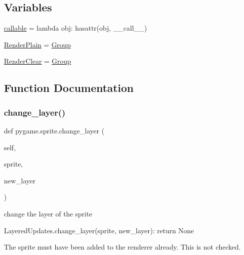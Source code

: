 \subsection*{Variables}
\begin{DoxyCompactItemize}
\item 
\hyperlink{namespacepygame_1_1sprite_a800dcabe3c7d87b3e8f22bcbb204bf22}{callable} = lambda obj\+: hasattr(obj, \textquotesingle{}\+\_\+\+\_\+call\+\_\+\+\_\+\textquotesingle{})
\item 
\hyperlink{namespacepygame_1_1sprite_a3e060a482e09d1a567cb7356c2cf4a33}{Render\+Plain} = \hyperlink{classpygame_1_1sprite_1_1_group}{Group}
\item 
\hyperlink{namespacepygame_1_1sprite_a809335dc88fa487b290217358e9638d7}{Render\+Clear} = \hyperlink{classpygame_1_1sprite_1_1_group}{Group}
\end{DoxyCompactItemize}


\subsection{Function Documentation}
\mbox{\label{namespacepygame_1_1sprite_a382eb838f5cdf51df1202a0f3350f8fc}} 
\subsubsection{\texorpdfstring{change\+\_\+layer()}{change\_layer()}}
{\footnotesize\ttfamily def pygame.\+sprite.\+change\+\_\+layer (\begin{DoxyParamCaption}\item[{}]{self,  }\item[{}]{sprite,  }\item[{}]{new\+\_\+layer }\end{DoxyParamCaption})}

\begin{DoxyVerb}change the layer of the sprite

LayeredUpdates.change_layer(sprite, new_layer): return None

The sprite must have been added to the renderer already. This is not
checked.\end{DoxyVerb}
 \mbox{\label{namespacepygame_1_1sprite_ac3dd48705499b86a7214761b75380981}} 
